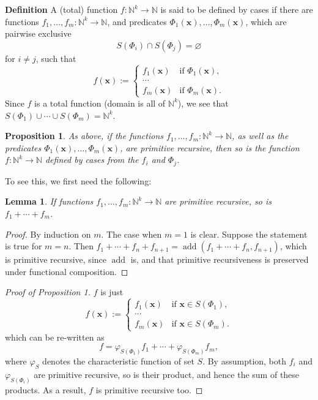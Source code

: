 \documentclass[12pt]{article}
\newtheorem{prop}{Proposition}
\newtheorem{lem}{Lemma}
\begin{document}
\textbf{Definition}  A (total) function $f:\mathbb{N}^k \to \mathbb{N}$ is said to be defined by cases if there are functions $f_1, \ldots, f_m:\mathbb{N}^k \to \mathbb{N}$, and predicates $\Phi_1(\boldsymbol{x}), \ldots, \Phi_m(\boldsymbol{x})$, which are pairwise exclusive $$S(\Phi_i)\cap S(\Phi_j)=\varnothing$$ for $i\ne j$, such that
\begin{displaymath}
f(\boldsymbol{x}):= \left\{
\begin{array}{ll}
f_1(\boldsymbol{x}) & \textrm{if } \Phi_1(\boldsymbol{x}), \\
\cdots \\
f_m(\boldsymbol{x}) & \textrm{if } \Phi_m(\boldsymbol{x}).
\end{array}
\right.
\end{displaymath}
Since $f$ is a total function (domain is all of $\mathbb{N}^k$), we see that $S(\Phi_1) \cup \cdots \cup S(\Phi_m)=\mathbb{N}^k$.

\begin{prop}  As above, if the functions $f_1, \ldots, f_m:\mathbb{N}^k \to \mathbb{N}$, as well as the predicates $\Phi_1(\boldsymbol{x}), \ldots, \Phi_m(\boldsymbol{x})$, are primitive recursive, then so is the function $f:\mathbb{N}^k \to \mathbb{N}$ defined by cases from the $f_i$ and $\Phi_j$. \end{prop}

To see this, we first need the following:
\begin{lem} If functions $f_1, \ldots, f_m:\mathbb{N}^k \to \mathbb{N}$ are primitive recursive, so is $f_1 +\cdots + f_m$. \end{lem}
\begin{proof} By induction on $m$.  The case when $m=1$ is clear.  Suppose the statement is true for $m=n$.  Then $f_1 + \cdots + f_n + f_{n+1} = \operatorname{add}(f_1+\cdots+f_n,f_{n+1})$, which is primitive recursive, since $\operatorname{add}$ is, and that primitive recursiveness is preserved under functional composition.
\end{proof}

\begin{proof}[Proof of Proposition 1] $f$ is just
\begin{displaymath}
f(\boldsymbol{x}):= \left\{
\begin{array}{ll}
f_1(\boldsymbol{x}) & \textrm{if } \boldsymbol{x} \in S(\Phi_1), \\
\cdots \\
f_m(\boldsymbol{x}) & \textrm{if } \boldsymbol{x} \in S(\Phi_m).
\end{array}
\right.
\end{displaymath}
which can be re-written as $$f=\varphi_{S(\Phi_1)} f_1 + \cdots + \varphi_{S(\Phi_m)}f_m,$$ where $\varphi_S$ denotes the characteristic function of set $S$.  By assumption, both $f_i$ and $\varphi_{S(\Phi_i)}$ are primitive recursive, so is their product, and hence the sum of these products.  As a result, $f$ is primitive recursive too.  \end{proof}
\end{document}
